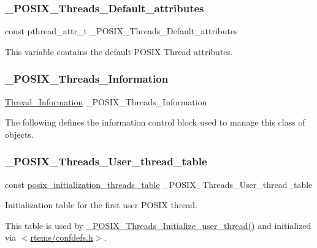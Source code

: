 \subsubsection{\texorpdfstring{\_POSIX\_Threads\_Default\_attributes}{\_POSIX\_Threads\_Default\_attributes}}
{\footnotesize\ttfamily const pthread\+\_\+attr\+\_\+t \+\_\+\+P\+O\+S\+I\+X\+\_\+\+Threads\+\_\+\+Default\+\_\+attributes}

This variable contains the default P\+O\+S\+IX Thread attributes. \mbox{\label{group__POSIX__PTHREAD_ga1d9814955c385da84ecea90c53f13b9d}} 
\subsubsection{\texorpdfstring{\_POSIX\_Threads\_Information}{\_POSIX\_Threads\_Information}}
{\footnotesize\ttfamily \mbox{\hyperlink{structThread__Information}{Thread\+\_\+\+Information}} \+\_\+\+P\+O\+S\+I\+X\+\_\+\+Threads\+\_\+\+Information}

The following defines the information control block used to manage this class of objects. \mbox{\label{group__POSIX__PTHREAD_ga096d9da086e4a4519e8383da4fb4921d}} 
\subsubsection{\texorpdfstring{\_POSIX\_Threads\_User\_thread\_table}{\_POSIX\_Threads\_User\_thread\_table}}
{\footnotesize\ttfamily const \mbox{\hyperlink{structposix__initialization__threads__table}{posix\+\_\+initialization\+\_\+threads\+\_\+table}} \+\_\+\+P\+O\+S\+I\+X\+\_\+\+Threads\+\_\+\+User\+\_\+thread\+\_\+table}



Initialization table for the first user P\+O\+S\+IX thread. 

This table is used by \mbox{\hyperlink{group__POSIX__PTHREAD_ga1695c0a5d29b5bb9c805a8a58b943214}{\+\_\+\+P\+O\+S\+I\+X\+\_\+\+Threads\+\_\+\+Initialize\+\_\+user\+\_\+thread()}} and initialized via $<$\mbox{\hyperlink{confdefs_8h}{rtems/confdefs.\+h}}$>$. 